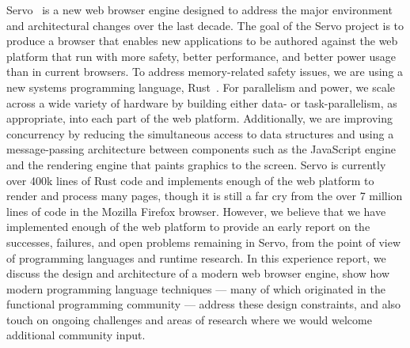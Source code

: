 Servo~\cite{SERVO} is a new web browser engine designed to address the major environment and 
architectural changes over the last decade.
The goal of the Servo project is to produce a browser that enables new applications to be authored
against the web platform that run with more safety, better performance, and better power usage
than in current browsers.
To address memory-related safety issues, we are using a new systems programming language,
Rust~\cite{RUST}.
For parallelism and power, we scale across a wide variety of hardware by building either data-
or task-parallelism, as appropriate, into each part of the web platform.
Additionally, we are improving concurrency by reducing the simultaneous access to data
structures and using a message-passing architecture between components such as the
JavaScript engine and the rendering engine that paints graphics to the screen.
Servo is currently over 400k lines of Rust code and implements enough of the web platform to render and
process many pages, though it is still a far cry from the over 7 million lines of code in
the Mozilla Firefox browser.
However, we believe that we have implemented enough of the web platform to provide an
early report on the successes, failures, and open problems remaining in Servo, from the
point of view of programming languages and runtime research.
In this experience report, we discuss the design and architecture of a modern web 
browser engine, show how modern programming language techniques --- many of which
originated in the functional programming community --- address these design 
constraints, and also touch on ongoing challenges and areas of research where we
would welcome additional community input.

